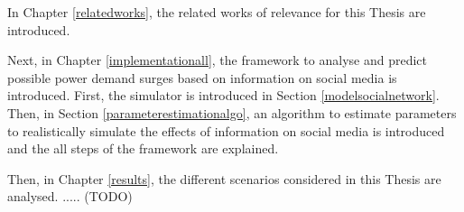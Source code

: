 In Chapter \ref{relatedworks}, the related works of relevance for 
this Thesis are introduced.

Next, in Chapter \ref{implementationall}, the framework to
analyse and predict possible power demand surges based on
information on social media is introduced.
First, the simulator is introduced in Section \ref{modelsocialnetwork}.
Then, in Section \ref{parameterestimationalgo}, 
an algorithm to estimate parameters to realistically simulate
the effects of information on social media is introduced and 
the all steps of the framework are explained.

Then, in Chapter \ref{results}, the different scenarios considered in this
Thesis are analysed. ..... (TODO)